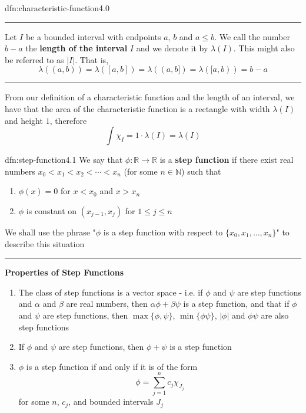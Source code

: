 \documentclass[landscape, 8pt]{extarticle}
\begin{document}
\begin{multicols}{3}
\begin{dfn}{dfn:characteristic-function}{4.0}
	\noindent\rule{\textwidth}{0.2pt}
	
	Let $I$ be a bounded interval with endpoints $a,\,b$ and $a\le b$. We call the number $b-a$ the \textbf{length of the interval} $I$ and we denote it by $\lambda(I)$. This might also be referred to as $\lvert I \rvert$. That is,
	\[\lambda((a,b)) = \lambda([a,b]) = \lambda((a,b]) = \lambda([a,b)) = b-a\]

	\noindent\rule{\textwidth}{0.2pt}
	From our definition of a characteristic function and the length of an interval, we have that the area of the characteristic function is a rectangle with width $\lambda(I)$ and height $1$, therefore
	\[\int \chi_{I} = 1 \cdot \lambda(I) = \lambda(I)\]
\end{dfn}

\begin{dfn}{dfn:step-function}{4.1}
	We say that $\phi:\mathbb{R}\to \mathbb{R}$ is a \textbf{step function} if there exist real numbers $x_{0}<x_{1}<x_{2}<\cdots<x_{n}$ (for some $n\in \mathbb{N}$) such that

	\begin{enumerate}
	    \setlength\itemsep{0em}
	    \item $\phi(x)=0$ for $x<x_{0}$ and $x>x_{n}$
	    \item $\phi$ is constant on $(x_{j-1}, x_{j})$ for $1\le j \le n$
	\end{enumerate}

	We shall use the phrase "$\phi$ is a step function with respect to $\{x_{0},x_{1},\dots,x_{n}\}$" to describe this situation


	\noindent\rule{\textwidth}{0.2pt}

	\textbf{Properties of Step Functions}

	\begin{enumerate}
	    \setlength\itemsep{0em}
	    \item The class of step functions is a vector space - i.e. if $\phi$ and $\psi$ are step functions and $\alpha$ and $\beta$ are real numbers, then $\alpha\phi+\beta\psi$ is a step function, and that if $\phi$ and $\psi$ are step functions, then $\max\{\phi,\psi\}$, $\min\{\phi\psi\}$, $\lvert \phi \rvert$ and $\phi\psi$ are also step functions
	    \item If $\phi$ and $\psi$ are step functions, then $\phi + \psi$ is a step function
	    \item $\phi$ is a step function if and only if it is of the form
	\[\phi=\sum_{j=1}^{n} c_{j}\chi_{J_{j}}\]
	for some $n$, $c_{j}$, and bounded intervals $J_{j}$
	\end{enumerate}


\end{dfn}
\end{multicols}
\end{document}
